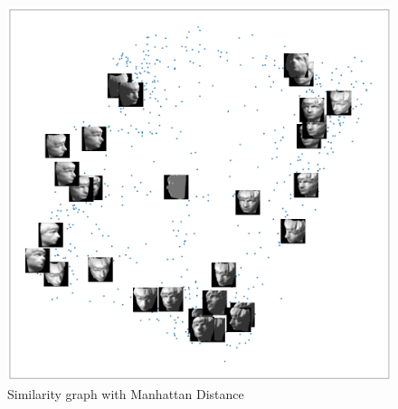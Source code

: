 \documentclass[twoside,10pt]{article}
\begin{document}
\begin{enumerate}
\begin{itemize}
\begin{figure}[h!]
\begin{center}
\includegraphics[totalheight=3in]{Images/Q1cgraph.png}
\end{center}
\caption{Similarity graph with Manhattan Distance}
\end{figure}


\end{itemize}
\end{enumerate}
\end{document}
